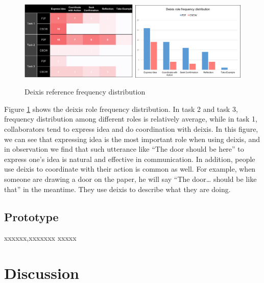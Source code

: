 \documentclass[12pt,twoside]{article}
\begin{document}
\begin{figure}
\includegraphics[width = 0.50\textwidth]{deixis_role_a.png}
\includegraphics[width = 0.486\textwidth]{deixis_role_b.png}
\caption{Deixis reference frequency distribution}
\label{Deixis_role}
\end{figure}

Figure \ref{Deixis_role} shows the deixis role frequency distribution. In task 2 and task 3, frequency distribution among different roles is relatively average, while in task 1, collaborators tend to express idea and do coordination with deixis. In this figure, we can see that expressing idea is the most important role when using deixis, and in observation we find that such utterance like “The door should be here” to express one’s idea is natural and effective in communication. In addition, people use deixis to coordinate with their action is common as well. For example, when someone are drawing a door on the paper, he will say “The door… should be like that” in the meantime. They use deixis to describe what they are doing. 

\subsection{Prototype}
xxxxxx,xxxxxxx
xxxxx

\section{Discussion}
\label{sec:discussion}
\end{document}

